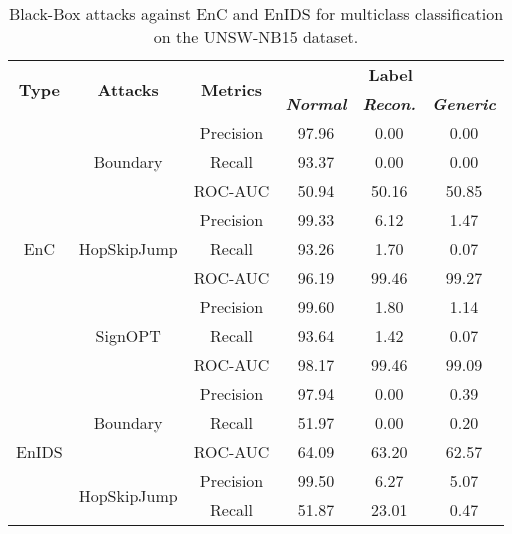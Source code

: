 \documentclass[conference]{IEEEtran}
\begin{document}
	
	
	\begin{table}[H]
		\caption{Black-Box attacks against EnC and EnIDS for multiclass classification on the UNSW-NB15 dataset.}
		\small
		\setlength{\tabcolsep}{1pt}
		\centering
		\label{tab:unsw_multi_black}
		
		\begin{tabular}{|c|c|c|c|c|c|}
			\hline
			\multirow{2}{*}{\textbf{Type}} & \multirow{2}{*}{\textbf{Attacks}} & \multirow{2}{*}{\textbf{Metrics}} & \multicolumn{3}{c|}{\textbf{Label}} \\
			\cline{4-6}
			&  &  & \textbf{\textsl{Normal}} & \textbf{\textsl{Recon.}} & \textbf{\textsl{Generic}} \\
			\hline
			\multirow{9}{*}{EnC} & \multirow{3}{*}{Boundary} & Precision & 97.96 & 0.00 & 0.00
			\\
			
			&  & Recall & 93.37 & 0.00 & 0.00
			\\
			
			&  & ROC-AUC & 50.94 & 50.16 & 50.85
			\\
			\cline{2-6}
			& \multirow{3}{*}{HopSkipJump} & Precision & 99.33 & 6.12 & 1.47
			\\
			
			&  & Recall & 93.26 & 1.70 & 0.07
			\\
			
			&  & ROC-AUC & 96.19 & 99.46 & 99.27
			\\
			\cline{2-6}
			& \multirow{3}{*}{SignOPT} & Precision & 99.60 & 1.80 & 1.14
			\\
			
			&  & Recall & 93.64 & 1.42 & 0.07
			\\
			
			&  & ROC-AUC & 98.17 & 99.46 & 99.09
			\\
			\hline
			\multirow{9}{*}{EnIDS} & \multirow{3}{*}{Boundary} & Precision & 97.94 & 0.00 & 0.39
			\\
			
			&  & Recall & 51.97 & 0.00 & 0.20
			\\
			
			&  & ROC-AUC & \cellcolor{yellow!50}64.09 & \cellcolor{yellow!50}63.20 & \cellcolor{yellow!50}62.57
			\\
			\cline{2-6}
			& \multirow{3}{*}{HopSkipJump} & Precision & \cellcolor{yellow!50}99.50 & 6.27 & 5.07
			\\
			
			&  & Recall & 51.87 & 23.01 & 0.47
			\\
			

\end{tabular}
\end{table}
\end{document}
